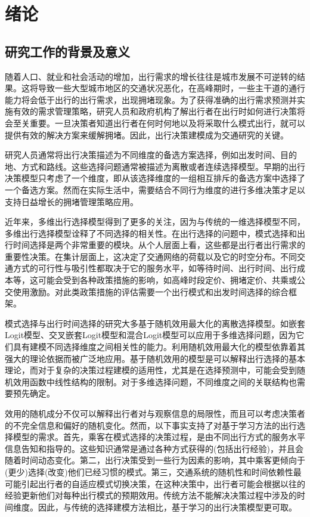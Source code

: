 \chapter{绪论}
\label{chp:installation}


\section{研究工作的背景及意义}

随着人口、就业和社会活动的增加，出行需求的增长往往是城市发展不可逆转的结果。这将导致一些大型城市地区的交通状况恶化，在高峰期时，一些主干道的通行能力将会低于出行的出行需求，出现拥堵现象。为了获得准确的出行需求预测并实施有效的需求管理策略，研究人员和政府机构了解出行者在出行时如何进行决策将会至关重要。一旦决策者知道出行者在何时何地以及将采取什么模式出行，就可以提供有效的解决方案来缓解拥堵。因此，出行决策建模成为交通研究的关键。

研究人员通常将出行决策描述为不同维度的备选方案选择，例如出发时间、目的地、方式和路线。这些选择问题通常被描述为离散或者连续选择模型。早期的出行决策模型只考虑了一个维度，即从该选择维度的一组相互排斥的备选方案中选择了一个备选方案。然而在实际生活中，需要结合不同行为维度的进行多维决策才足以支持日益增长的拥堵管理策略应用。

近年来，多维出行选择模型得到了更多的关注，因为与传统的一维选择模型不同，多维出行选择模型诠释了不同选择的相关性。在出行选择的问题中，模式选择和出行时间选择是两个非常重要的模块。从个人层面上看，这些都是出行者出行需求的重要性决策。在集计层面上，这决定了交通网络的荷载以及它的时空分布。不同交通方式的可行性与吸引性都取决于它的服务水平，如等待时间、出行时间、出行成本等，这可能会受到各种政策措施的影响，如高峰时段定价、拥堵定价、共乘或公交使用激励。对此类政策措施的评估需要一个出行模式和出发时间选择的综合框架。

模式选择与出行时间选择的研究大多基于随机效用最大化的离散选择模型。如嵌套Logit模型、交叉嵌套Logit模型和混合Logit模型可以应用于多维选择问题\cite{1018216030.nh}，因为它们具有建模不同选择维度之间相关性的能力。利用随机效用最大化的模型依靠着其强大的理论依据而被广泛地应用。基于随机效用的模型是可以解释出行选择的基本理论，而对于复杂的决策过程建模的适用性，尤其是在选择预测中，可能会受到随机效用函数中线性结构的限制。对于多维选择问题，不同维度之间的关联结构也需要预先确定。

效用的随机成分不仅可以解释出行者对与观察信息的局限性，而且可以考虑决策者的不完全信息和偏好的随机变化。然而，以下事实支持了对基于学习方法的出行选择模型的需求。首先，乘客在模式选择的决策过程，是由不同出行方式的服务水平信息告知和指导的。这些知识通常是通过各种方式获得的(包括出行经验)，并且会随着时间动态变化。第二，出行决策受到一些行为因素的影响，其中乘客更倾向于(更少)选择(改变)他们已经习惯的模式。第三，交通系统的随机性和时间依赖性最可能引起出行者的自适应模式切换决策，在这种决策中，出行者可能会根据以往的经验更新他们对每种出行模式的预期效用。传统方法不能解决决策过程中涉及的时间维度。因此，与传统的选择建模方法相比，基于学习的出行决策模型更可取。

